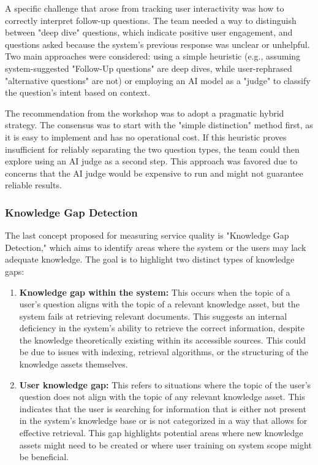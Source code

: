 \documentclass[
	english,
	ruledheaders=section,%
	class=report,%
	thesis={type=bachelor},%
	accentcolor=1b,%
	custommargins=true,%
	marginpar=false,%
	parskip=half-,%
	fontsize=11pt,%
	DIV=14,
]{tudapub}
\begin{document}
A specific challenge that arose from tracking user interactivity was how to correctly interpret follow-up questions. The team needed a way to distinguish between "deep dive" questions, which indicate positive user engagement, and questions asked because the system's previous response was unclear or unhelpful. Two main approaches were considered: using a simple heuristic (e.g., assuming system-suggested "Follow-Up questions" are deep dives, while user-rephrased "alternative questions" are not) or employing an AI model as a "judge" to classify the question's intent based on context.

The recommendation from the workshop was to adopt a pragmatic hybrid strategy. The consensus was to start with the "simple distinction" method first, as it is easy to implement and has no operational cost. If this heuristic proves insufficient for reliably separating the two question types, the team could then explore using an AI judge as a second step. This approach was favored due to concerns that the AI judge would be expensive to run and might not guarantee reliable results.
\subsubsection{Knowledge Gap Detection}
The last concept proposed for measuring service quality is "Knowledge Gap Detection," which aims to identify areas where the system or the users may lack adequate knowledge. The goal is to highlight two distinct types of knowledge gaps:

\begin{enumerate}
    \item \textbf{Knowledge gap within the system:} This occurs when the topic of a user's question aligns with the topic of a relevant knowledge asset, but the system fails at retrieving relevant documents. This suggests an internal deficiency in the system's ability to retrieve the correct information, despite the knowledge theoretically existing within its accessible sources. This could be due to issues with indexing, retrieval algorithms, or the structuring of the knowledge assets themselves.
    \item \textbf{User knowledge gap:} This refers to situations where the topic of the user's question does not align with the topic of any relevant knowledge asset. This indicates that the user is searching for information that is either not present in the system's knowledge base or is not categorized in a way that allows for effective retrieval. This gap highlights potential areas where new knowledge assets might need to be created or where user training on system scope might be beneficial.
\end{enumerate}
\end{document}
